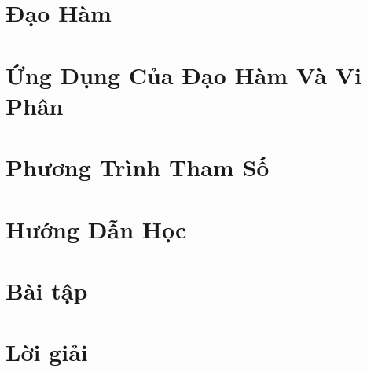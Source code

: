 \section{Đạo Hàm}

\section{Ứng Dụng Của Đạo Hàm Và Vi Phân}

\section{Phương Trình Tham Số}

\section{Hướng Dẫn Học}
\section{Bài tập}

\section{Lời giải }


\begin{refsection}
\nocite{einstein1905}
\nocite{knuth1984}
\printbibliography
\end{refsection}


